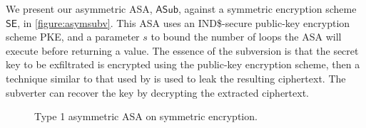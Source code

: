 We present our asymmetric ASA, $\mathsf{ASub}$, against a symmetric encryption scheme $\mathsf{SE}$, in \autoref{figure:asymsubv}. This ASA uses an IND\$-secure public-key encryption scheme PKE, and a parameter $s$ to bound the number of loops the ASA will execute before returning a value. The essence of the subversion is that the secret key to be exfiltrated is encrypted using the public-key encryption scheme, then a technique similar to that used by \cite{C:BelPatRog14} is used to leak the resulting ciphertext. The subverter can recover the key by decrypting the extracted ciphertext.

\begin{wrapfigure}{L}{0.4\textwidth}
\centering
{}
\caption[Type 1 asymmetric ASA on symmetric encryption]{Type 1 asymmetric ASA on symmetric encryption.}
\label{figure:asymsubv}
\end{wrapfigure}

